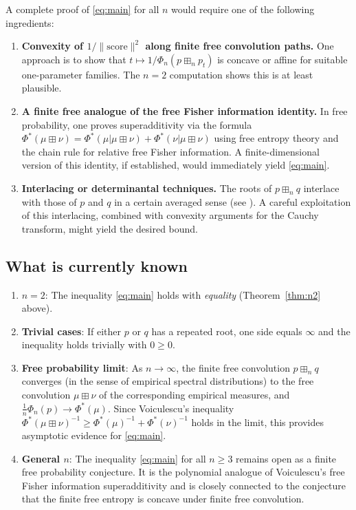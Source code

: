 \documentclass[12pt]{article}
\theoremstyle{definition}
\begin{document}
A complete proof of \eqref{eq:main} for all $n$ would require one of the following ingredients:

\begin{enumerate}
\item \textbf{Convexity of $1/\|\mathrm{score}\|^2$ along finite free convolution paths.} One approach is to show that $t \mapsto 1/\Phi_n(p \boxplus_n p_t)$ is concave or affine for suitable one-parameter families. The $n=2$ computation shows this is at least plausible.

\item \textbf{A finite free analogue of the free Fisher information identity.} In free probability, one proves superadditivity via the formula $\Phi^*(\mu \boxplus \nu) = \Phi^*(\mu|\mu \boxplus \nu) + \Phi^*(\nu|\mu \boxplus \nu)$ using free entropy theory and the chain rule for relative free Fisher information. A finite-dimensional version of this identity, if established, would immediately yield \eqref{eq:main}.

\item \textbf{Interlacing or determinantal techniques.} The roots of $p \boxplus_n q$ interlace with those of $p$ and $q$ in a certain averaged sense (see \cite{MSS15}). A careful exploitation of this interlacing, combined with convexity arguments for the Cauchy transform, might yield the desired bound.
\end{enumerate}

\subsection{What is currently known}

\begin{enumerate}
\item \textbf{$n = 2$}: The inequality \eqref{eq:main} holds with \emph{equality} (Theorem~\ref{thm:n2} above).

\item \textbf{Trivial cases}: If either $p$ or $q$ has a repeated root, one side equals $\infty$ and the inequality holds trivially with $0 \geq 0$.

\item \textbf{Free probability limit}: As $n \to \infty$, the finite free convolution $p \boxplus_n q$ converges (in the sense of empirical spectral distributions) to the free convolution $\mu \boxplus \nu$ of the corresponding empirical measures, and $\frac{1}{n}\Phi_n(p) \to \Phi^*(\mu)$. Since Voiculescu's inequality $\Phi^*(\mu \boxplus \nu)^{-1} \geq \Phi^*(\mu)^{-1} + \Phi^*(\nu)^{-1}$ holds in the limit, this provides asymptotic evidence for \eqref{eq:main}.

\item \textbf{General $n$}: The inequality \eqref{eq:main} for all $n \geq 3$ remains open as a finite free probability conjecture. It is the polynomial analogue of Voiculescu's free Fisher information superadditivity and is closely connected to the conjecture that the finite free entropy is concave under finite free convolution.
\end{enumerate}
\end{document}

